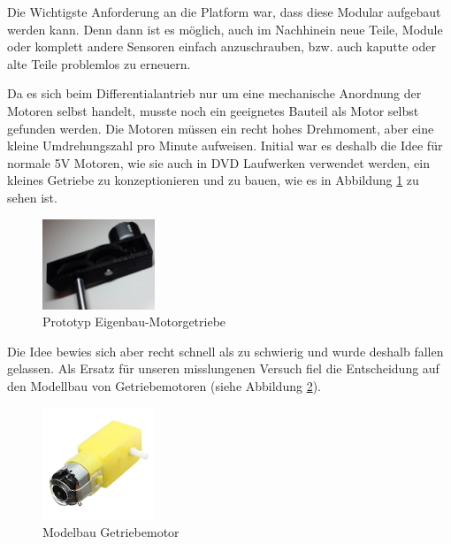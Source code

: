 \begin{flushleft}
    Die Wichtigste Anforderung an die Platform war, dass diese Modular aufgebaut werden kann. Denn dann ist es möglich, auch im Nachhinein
    neue Teile, Module oder komplett andere Sensoren einfach anzuschrauben, bzw. auch kaputte oder alte Teile problemlos zu erneuern.

    Da es sich beim Differentialantrieb nur um eine mechanische Anordnung der Motoren selbst handelt, musste noch ein
    geeignetes Bauteil als Motor selbst gefunden werden.
    Die Motoren müssen ein recht hohes Drehmoment, aber eine kleine Umdrehungszahl pro Minute aufweisen.
    Initial war es deshalb die Idee für normale 5V Motoren, wie sie auch in DVD Laufwerken verwendet werden, ein kleines
    Getriebe zu konzeptionieren und zu bauen, wie es in Abbildung \ref{fig:prototyp_transmission} zu sehen ist.

    \begin{figure}[h!]
        \centering
        \includegraphics[width=0.3\textwidth]{imgs/Roboter/Real/Getriebe.jpg}
        \caption{Prototyp Eigenbau-Motorgetriebe}
        \label{fig:prototyp_transmission}%
    \end{figure}

    Die Idee bewies sich aber recht schnell als zu schwierig und wurde deshalb fallen gelassen.
    Als Ersatz für unseren misslungenen Versuch fiel die Entscheidung auf den Modellbau von Getriebemotoren (siehe Abbildung \ref{fig:robot_motor}).

    \begin{figure}[h!]
        \centering
        \includegraphics[width=0.3\textwidth]{imgs/Roboter/Real/41eJJZ8mOOL._SX342_.jpg}
        \caption{Modelbau Getriebemotor}
        \label{fig:robot_motor}%
    \end{figure}


\end{flushleft}
